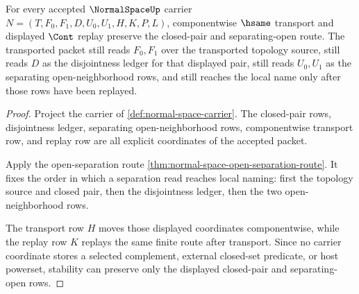 \begin{theorem}
\label{thm:normal-space-closed-pair-stability}
For every accepted $\NormalSpaceUp$ carrier $N=(T,F_0,F_1,D,U_0,U_1,H,K,P,L)$, componentwise $\hsame$ transport and displayed $\Cont$ replay preserve the closed-pair and separating-open route. The transported packet still reads $F_0,F_1$ over the transported topology source, still reads $D$ as the disjointness ledger for that displayed pair, still reads $U_0,U_1$ as the separating open-neighborhood rows, and still reaches the local name only after those rows have been replayed.
\end{theorem}
\begin{proof}
Project the carrier of \autoref{def:normal-space-carrier}. The closed-pair rows, disjointness ledger, separating open-neighborhood rows, componentwise transport row, and replay row are all explicit coordinates of the accepted packet.

Apply the open-separation route \autoref{thm:normal-space-open-separation-route}. It fixes the order in which a separation read reaches local naming: first the topology source and closed pair, then the disjointness ledger, then the two open-neighborhood rows.

The transport row $H$ moves those displayed coordinates componentwise, while the replay row $K$ replays the same finite route after transport. Since no carrier coordinate stores a selected complement, external closed-set predicate, or host powerset, stability can preserve only the displayed closed-pair and separating-open rows.
\end{proof}

